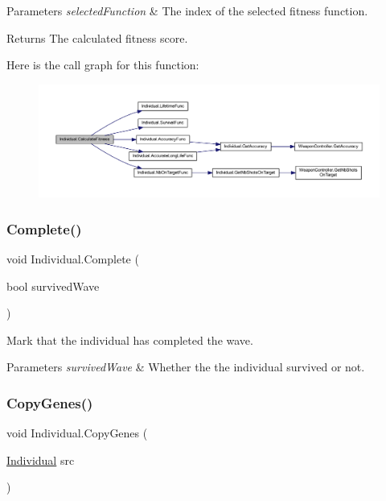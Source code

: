 \begin{DoxyParams}{Parameters}
{\em selected\+Function} & The index of the selected fitness function.\\
\hline
\end{DoxyParams}
\begin{DoxyReturn}{Returns}
The calculated fitness score.
\end{DoxyReturn}
Here is the call graph for this function\+:\nopagebreak
\begin{figure}[H]
\begin{center}
\leavevmode
\includegraphics[width=350pt]{class_individual_a75dd9bebe96f8ff2bad0f60381926085_cgraph}
\end{center}
\end{figure}
\mbox{\label{class_individual_a3aba987110bfa0ca5eb4f2a7924524da}} 
\subsubsection{\texorpdfstring{Complete()}{Complete()}}
{\footnotesize\ttfamily void Individual.\+Complete (\begin{DoxyParamCaption}\item[{bool}]{survived\+Wave }\end{DoxyParamCaption})}



Mark that the individual has completed the wave. 


\begin{DoxyParams}{Parameters}
{\em survived\+Wave} & Whether the the individual survived or not.\\
\hline
\end{DoxyParams}
\mbox{\label{class_individual_a7a4c37b420810992cc80448fb7e8652d}} 
\subsubsection{\texorpdfstring{Copy\+Genes()}{CopyGenes()}}
{\footnotesize\ttfamily void Individual.\+Copy\+Genes (\begin{DoxyParamCaption}\item[{\mbox{\hyperlink{class_individual}{Individual}}}]{src }\end{DoxyParamCaption})}



